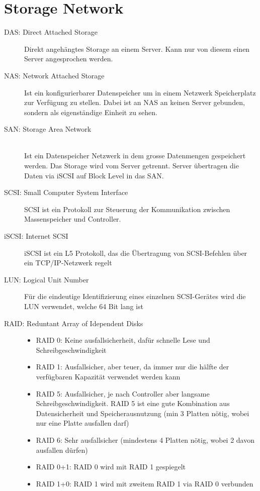 \section{Storage Network}
\begin{description}
	\item[DAS: Direct Attached Storage] Direkt angehängtes Storage an einem Server. Kann nur von diesem einen Server angesprochen werden.
	\item[NAS: Network Attached Storage] Ist ein konfigurierbarer Datenspeicher um in einem Netzwerk Speicherplatz zur Verfügung zu stellen. Dabei ist an NAS an keinen Server gebunden, sondern als eigenständige Einheit zu sehen.
	\item[SAN: Storage Area Network]  \hfill \\ Ist ein Datenspeicher Netzwerk in dem grosse Datenmengen gespeichert werden. Das Storage wird vom Server getrennt. Server übertragen die Daten via iSCSI auf Block Level in das SAN. 
	\item[SCSI: Small Computer System Interface] SCSI ist ein Protokoll zur Steuerung der Kommunikation zwischen Massenspeicher und Controller. 
	\item[iSCSI: Internet SCSI] iSCSI ist ein L5 Protokoll, das die Übertragung von SCSI-Befehlen über ein TCP/IP-Netzwerk regelt
	\item[LUN: Logical Unit Number] Für die eindeutige Identifizierung eines einzelnen SCSI-Gerätes wird die LUN verwendet, welche 64 Bit lang ist
	\item[RAID: Reduntant Array of Idependent Disks] \hfill
	\begin{itemize}
		\item RAID 0: Keine ausfallsicherheit, dafür schnelle Lese und Schreibgeschwindigkeit
		\item RAID 1: Ausfallsicher, aber teuer, da immer nur die hälfte der verfügbaren Kapazität verwendet werden kann
		\item RAID 5: Ausfallsicher, je nach Controller aber langsame Schreibgeschwindigkeit. RAID 5 ist eine gute Kombination aus Datensicherheit und Speicherausnutzung (min 3 Platten nötig, wobei nur eine Platte ausfallen darf)
		\item RAID 6: Sehr ausfallsicher (mindestens 4 Platten nötig, wobei 2 davon ausfallen dürfen)
		\item RAID 0+1: RAID 0 wird mit RAID 1 gespiegelt
		\item RAID 1+0: RAID 1 wird mit zweitem RAID 1 via RAID 0 verbunden
	\end{itemize}
\end{description}


